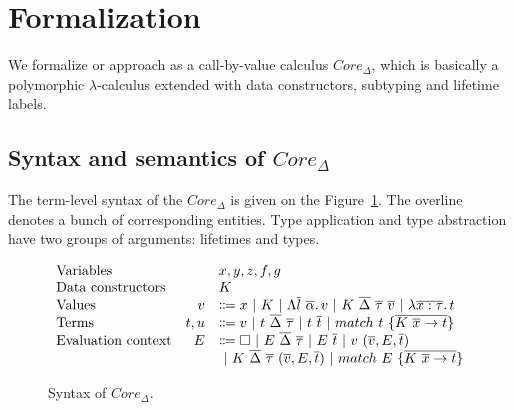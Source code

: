 \documentclass[11pt]{article}
\newcommand{\vor}{~|~}
\newcommand{\ap}{~}
\begin{document}
    \section{Formalization} \label{sec:formalization}

    We formalize or approach as a call-by-value calculus $Core_{\Delta}$, which is basically a polymorphic $\lambda$-calculus extended with data constructors, subtyping and lifetime labels.

    \subsection{Syntax and semantics of $Core_\Delta$}

    The term-level syntax of the $Core_\Delta$ is given on the Figure~\ref{fig:core-syntax}.
    The overline denotes a bunch of corresponding entities.
    Type application and type abstraction have two groups of arguments: lifetimes and types.

    \begin{figure}
        \centering
        \[
            \begin{array}{lrl}
                \text{Variables}          &   & x, y, z, f, g                                                                                                                          \\
                \text{Data constructors}  &   & K                                                                                                                                      \\
                \text{Values} & v & \Coloneqq x \vor K \vor \Lambda \overline{l}~\overline{\alpha} \ldotp v \vor K\ap\overline{\Delta}\ap \overline{\tau} \ap \overline{v} \vor \lambda \overline{x : \tau}\ldotp t
                \\
                \text{Terms} & t, u & \Coloneqq v \vor t\ap\overline{\Delta}\ap\overline{\tau} \vor t\ap \overline{t} \vor match ~ t ~\{\overline{K \ap \overline{x} \to t}\}
                \\
                \text{Evaluation context} & E & \Coloneqq \square \vor E \ap\overline{\Delta}\ap \overline{\tau} \vor E \ap \overline{t} \vor v \ap (\overline{v}, E, \overline{t})    \\
                &   & \vor K\ap\overline{\Delta}\ap\overline{\tau}\ap(\overline{v}, E, \overline{t}) \vor match\ap E\ap \{\overline{K\ap\overline{x}\to t}\}
            \end{array}
        \]
        \caption{Syntax of $Core_\Delta$.}
        \label{fig:core-syntax}
    \end{figure}
\end{document}
